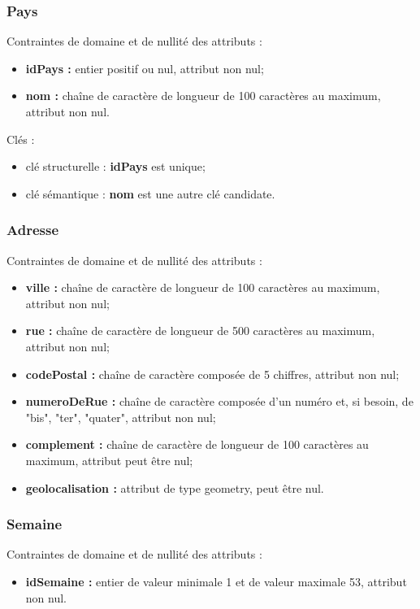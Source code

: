 \subsubsection*{Pays}
Contraintes de domaine et de nullité des attributs :
\begin{itemize}
	\item \textbf{idPays :} entier positif ou nul, attribut non nul;
	\item \textbf{nom :} chaîne de caractère de longueur de 100 caractères au maximum, attribut non nul. \\
\end{itemize}

Clés : 
\begin{itemize}
\item clé structurelle : \textbf{idPays} est unique;
\item clé sémantique : \textbf{nom} est une autre clé candidate. \\ 
\end{itemize}


\subsubsection*{Adresse}
Contraintes de domaine et de nullité des attributs :
\begin{itemize}
 	\item \textbf{ville :} chaîne de caractère de longueur de 100 caractères au maximum, attribut non nul;
	\item \textbf{rue :} chaîne de caractère de longueur de 500 caractères au maximum, attribut non nul;
	\item \textbf{codePostal :} chaîne de caractère composée de 5 chiffres, attribut non nul;
	\item \textbf{numeroDeRue :} chaîne de caractère composée d'un numéro et, si besoin, de "bis", "ter", "quater", attribut non nul; 
	\item \textbf{complement : } chaîne de caractère de longueur de 100 caractères au maximum, attribut peut être nul;
	\item \textbf{geolocalisation : } attribut de type geometry, peut être nul.\\
\end{itemize}

\subsubsection*{Semaine}
Contraintes de domaine et de nullité des attributs : 
\begin{itemize}
	\item \textbf{idSemaine :} entier de valeur minimale 1 et de valeur maximale 53, attribut non nul.
\end{itemize}

